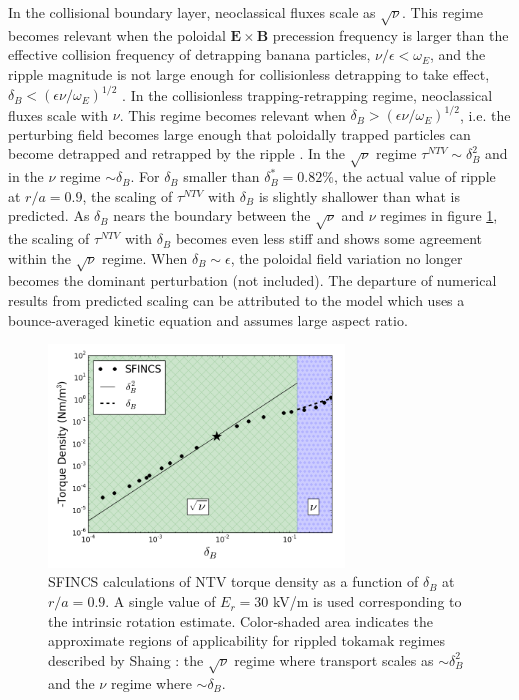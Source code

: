 \documentclass{article}
\begin{document}
In the collisional boundary layer, neoclassical fluxes scale as $\sqrt{\nu}$. This regime becomes relevant when the poloidal $\bm{E} \times \bm{B}$ precession frequency is larger than the effective collision frequency of detrapping banana particles, $\nu/\epsilon < \omega_E$, and the ripple magnitude is not large enough for collisionless detrapping to take effect, $\delta_B < \left(  \epsilon \nu/\omega_E \right)^{1/2}$ \cite{Shaing2008}. 
In the collisionless trapping-retrapping regime, neoclassical fluxes scale with $\nu$. This regime becomes relevant when $\delta_B > \left(  \epsilon \nu/\omega_E \right)^{1/2}$, i.e. the perturbing field becomes large enough that poloidally trapped particles can become detrapped and retrapped by the ripple \cite{Shaing2010}. In the $\sqrt{\nu}$ regime $\tau^{NTV} \sim \delta_B^2$ and in the $\nu$ regime $\sim \delta_B$. For $\delta_B$ smaller than $\delta_B^* = 0.82\%$, the actual value of ripple at $r/a=0.9$, the scaling of $\tau^{NTV}$ with $\delta_B$ is slightly shallower than what is predicted. 
As $\delta_B$ nears the boundary between the $\sqrt{\nu}$ and $\nu$ regimes in figure \ref{fig:scalescan}, the scaling of $\tau^{NTV}$ with $\delta_B$ becomes even less stiff and shows some agreement within the $\sqrt{\nu}$ regime. When $\delta_B \sim \epsilon$, the poloidal field variation no longer becomes the dominant perturbation (not included). The departure of numerical results from predicted scaling can be attributed to the model which uses a bounce-averaged kinetic equation and assumes large aspect ratio. 

\begin{figure}[h!]
\centering
\includegraphics[width=0.7\textwidth]
{scalescan.png}
\caption{\label{fig:scalescan} SFINCS calculations of NTV torque density as a function of $\delta_B$ at $r/a = 0.9$. A single value of $E_r = 30$ kV/m is used corresponding to the intrinsic rotation estimate. Color-shaded area indicates the approximate regions of applicability for rippled tokamak regimes described by Shaing \cite{Shaing2010, Shaing2008}: the $\sqrt{\nu}$ regime where transport scales as $\sim \delta_B^2$ and the $\nu$ regime where $\sim \delta_B$. }
\end{figure} 
\end{document}
